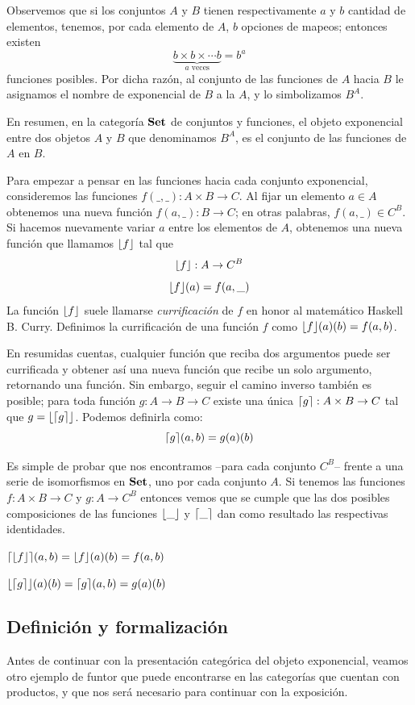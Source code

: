 Observemos que si los conjuntos $A$ y $B$ tienen respectivamente $a$ y $b$ cantidad de elementos, tenemos, por cada elemento de $A$, $b$ opciones de mapeos; entonces existen $$\underbrace{b \times b \times  \cdots  b}_{a \text{ veces}} = b^{a}$$
funciones posibles. Por dicha razón, al conjunto de las funciones de $A$ hacia $B$ le asignamos el nombre de exponencial de $B$ a la $A$, y lo simbolizamos $B^{A}$.

En resumen, en la categoría $\mathbf{Set}$ de conjuntos y funciones, el objeto exponencial entre dos objetos $A$ y $B$ que denominamos $B^{A}$, es el conjunto de las funciones de $A$ en $B$. 

Para empezar a pensar en las funciones hacia cada conjunto exponencial, consideremos las funciones $f(\_,\_) : A \times B \to C$.
Al fijar un elemento $a \in A$ obtenemos una nueva función $f(a,\_) : B \to C$; en otras palabras, $f(a,\_) \in C^{B}$. Si hacemos nuevamente variar $a$ entre los elementos de $A$, obtenemos una nueva función que llamamos $\lfloor f \rfloor$ tal que $$\lfloor f \rfloor : A \to C^{B}$$ $$\lfloor f \rfloor (a) = f(a, \_)$$
La función $\lfloor f \rfloor$ suele llamarse {\it currificación} de $f$ en honor al matemático Haskell B. Curry. Definimos la currificación de una función $f$ como $\lfloor f \rfloor (a)(b) = f(a,b)$. 

En resumidas cuentas, cualquier función que reciba dos argumentos puede ser currificada y obtener así una nueva función que recibe un solo argumento, retornando una función. Sin embargo, seguir el camino inverso también es posible; para toda función $g : A \to B \to C$ existe una única $\lceil g \rceil : A \times B \to C$ tal que $g = \lfloor \lceil g \rceil \rfloor$. Podemos definirla como: $$\lceil g \rceil(a,b) = g(a)(b)$$  

Es simple de probar que nos encontramos --para cada conjunto $C^B$-- frente a una serie de isomorfismos en $\mathbf{Set}$, uno por cada conjunto $A$. Si tenemos las funciones $f : A \times B\to C$ y $g : A\to C^{B}$ entonces vemos que se cumple que las dos posibles composiciones de las funciones $\lfloor \_ \rfloor$ y $\lceil \_ \rceil$ dan como resultado las respectivas identidades.

$\lceil \lfloor f \rfloor \rceil(a,b) = \lfloor f \rfloor(a)(b) = f(a,b) $

$\lfloor \lceil g \rceil \rfloor(a)(b) = \lceil g \rceil(a,b) = g(a)(b) $

\subsection{Definición y formalización}
Antes de continuar con la presentación categórica del objeto exponencial, veamos otro ejemplo de funtor que puede encontrarse en las categorías que cuentan con productos, y que nos será necesario para continuar con la exposición.


